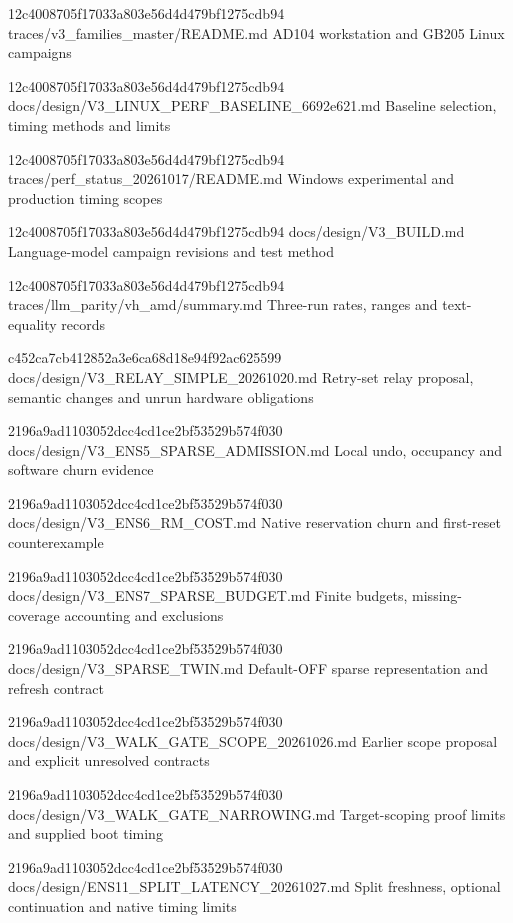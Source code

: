 \begin{description}[style=nextline]
{12c4008705f17033a803e56d4d479bf1275cdb94}
{traces/v3_families_master/README.md}
{AD104 workstation and GB205 Linux campaigns}

{12c4008705f17033a803e56d4d479bf1275cdb94}
{docs/design/V3_LINUX_PERF_BASELINE_6692e621.md}
{Baseline selection, timing methods and limits}

{12c4008705f17033a803e56d4d479bf1275cdb94}
{traces/perf_status_20261017/README.md}
{Windows experimental and production timing scopes}

{12c4008705f17033a803e56d4d479bf1275cdb94}
{docs/design/V3_BUILD.md}
{Language-model campaign revisions and test method}

{12c4008705f17033a803e56d4d479bf1275cdb94}
{traces/llm_parity/vh_amd/summary.md}
{Three-run rates, ranges and text-equality records}

{c452ca7cb412852a3e6ca68d18e94f92ac625599}
{docs/design/V3_RELAY_SIMPLE_20261020.md}
{Retry-set relay proposal, semantic changes and unrun hardware obligations}

{2196a9ad1103052dcc4cd1ce2bf53529b574f030}
{docs/design/V3_ENS5_SPARSE_ADMISSION.md}
{Local undo, occupancy and software churn evidence}

{2196a9ad1103052dcc4cd1ce2bf53529b574f030}
{docs/design/V3_ENS6_RM_COST.md}
{Native reservation churn and first-reset counterexample}

{2196a9ad1103052dcc4cd1ce2bf53529b574f030}
{docs/design/V3_ENS7_SPARSE_BUDGET.md}
{Finite budgets, missing-coverage accounting and exclusions}

{2196a9ad1103052dcc4cd1ce2bf53529b574f030}
{docs/design/V3_SPARSE_TWIN.md}
{Default-OFF sparse representation and refresh contract}

{2196a9ad1103052dcc4cd1ce2bf53529b574f030}
{docs/design/V3_WALK_GATE_SCOPE_20261026.md}
{Earlier scope proposal and explicit unresolved contracts}

{2196a9ad1103052dcc4cd1ce2bf53529b574f030}
{docs/design/V3_WALK_GATE_NARROWING.md}
{Target-scoping proof limits and supplied boot timing}

{2196a9ad1103052dcc4cd1ce2bf53529b574f030}
{docs/design/ENS11_SPLIT_LATENCY_20261027.md}
{Split freshness, optional continuation and native timing limits}


\end{description}

